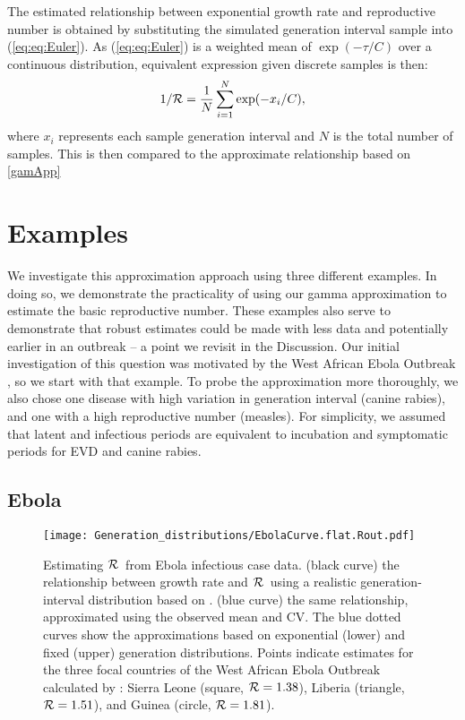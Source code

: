 \documentclass[12pt,]{article}
\newcommand{\RR}{\ensuremath{{\cal R}}}
\newcommand{\eref}[1]{(\ref{eq:#1})}
\begin{document}
The estimated relationship between exponential growth rate and reproductive number is obtained by substituting the simulated generation interval sample into \eref{eq:Euler}.
As \eref{eq:Euler} is a weighted mean of $\exp(-\tau/C)$ over a continuous distribution, equivalent expression given discrete samples is then:
\begin{equation}
1/\RR = \frac{1}{N} \sum_{i=1}^{N} \exp(-x_i/C),
\label{eq:obsR}
\end{equation}
where $x_i$ represents each sample generation interval and $N$ is the total number of samples. 
This is then compared to the approximate relationship based on \eqref{gamApp}

\section{Examples}

We investigate this approximation approach using three different examples. 
In doing so, we demonstrate the practicality of using our gamma approximation to estimate the basic reproductive number. 
These examples also serve to demonstrate that robust estimates could be made with less data and potentially earlier in an outbreak -- a point we revisit in the Discussion.
Our initial investigation of this question was motivated by the West African Ebola Outbreak \cite{WeitDush15}, so we start with that example. To probe the approximation more thoroughly, we also chose one disease with high variation in generation interval (canine rabies), and one with a high reproductive number (measles). 
For simplicity, we assumed that latent and infectious periods are equivalent to incubation and symptomatic periods for EVD and canine rabies.

\subsection{Ebola}
\label{EbolaEx}

\begin{figure}[htbp] \centering
	\texttt{[image: Generation\_distributions/EbolaCurve.flat.Rout.pdf]}
	\caption{Estimating \RR~from Ebola infectious case data.
(black curve) the relationship between growth rate and \RR~using a realistic generation-interval distribution based on \cite{AylwBarb14}.
(blue curve) the same relationship, approximated using the observed mean and CV. 
The blue dotted curves show the approximations based on exponential (lower) and fixed (upper) generation distributions.
Points indicate estimates for the three focal countries of the West African Ebola Outbreak calculated by \cite{AylwBarb14}: {Sierra Leone (square, $\RR=1.38$), Liberia (triangle, $\RR=1.51$), and Guinea (circle, $\RR=1.81$).}
	\label{fig:EbolaCurve}}
\end{figure}
\end{document}
